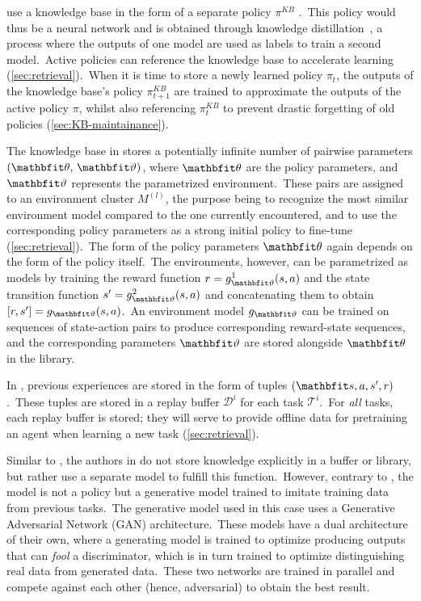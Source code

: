 \textcite{Schwarz2018} use a knowledge base in the form of a separate policy $\pi^{KB}$ .\ This policy would thus be a neural network and is obtained through knowledge distillation~\cite{Hinton2015}, a process where the outputs of one model are used as labels to train a second model.\ Active policies can reference the knowledge base to accelerate learning (\cref{sec:retrieval}).\ When it is time to store a newly learned policy $\pi_t$, the outputs of the knowledge base's policy $\pi^{KB}_{t+1}$ are trained to approximate the outputs of the active policy $\pi$, whilst also referencing $\pi^{KB}_{t}$ to prevent drastic forgetting of old policies (\cref{sec:KB-maintainance}).\

The knowledge base in \textcite{Wang2022} stores a potentially infinite number of pairwise parameters $(\bvec{\theta},\,\bvec{\vartheta})$, where $\bvec{\theta}$ are the policy parameters, and $\bvec{\vartheta}$ represents the parametrized environment.\ These pairs are assigned to an environment cluster $M^{(l)}$, the purpose being to recognize the most similar environment model compared to the one currently encountered, and to use the corresponding policy parameters as a strong initial policy to fine-tune (\cref{sec:retrieval}).\ The form of the policy parameters $\bvec{\theta}$ again depends on the form of the policy itself.\ The environments, however, can be parametrized as models by training the reward function $r = g^1_{\bvec{\vartheta}}(s, a)$ and the state transition function $s' = g^2_{\bvec{\vartheta}}(s, a)$ and concatenating them to obtain $[r, s'] = g_{\bvec{\vartheta}}(s, a)$.\ An environment model $g_{\bvec{\vartheta}}$ can be trained on sequences of state-action pairs to produce corresponding reward-state sequences, and the corresponding parameters $\bvec{\vartheta}$ are stored alongside $\bvec{\theta}$ in the library.\

In \textcite{Xie2021}, previous experiences are stored in the form of tuples $(\bvec{s, a, s'}, r)$.\ These tuples are stored in a replay buffer $\mathcal{D}^i$ for each task $\mathcal{T}^i$.\ For \emph{all} tasks, each replay buffer is stored; they will serve to provide offline data for pretraining an agent when learning a new task (\cref{sec:retrieval}).

Similar to \textcite{Schwarz2018}, the authors in \textcite{Shin2017} do not store knowledge explicitly in a buffer or library, but rather use a separate model to fulfill this function.\ However, contrary to \textcite{Schwarz2018}, the model is not a policy but a generative model trained to imitate training data from previous tasks.\ The generative model used in this case uses a Generative Adversarial Network (GAN) architecture.\ These models have a dual architecture of their own, where a generating model is trained to optimize producing outputs that can \emph{fool} a discriminator, which is in turn trained to optimize distinguishing real data from generated data.\ These two networks are trained in parallel and compete against each other (hence, adversarial) to obtain the best result.


